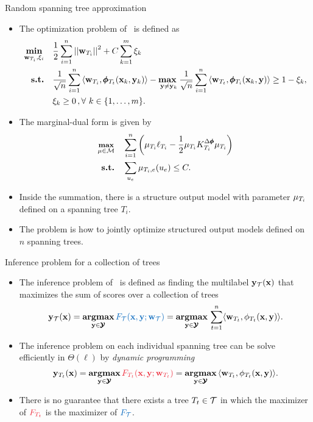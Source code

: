 \documentclass[first=dgreen,second=purple,logo=yellowexc]{aaltoslides}
\begin{document}
%
\begin{frame}{Random spanning tree approximation \rta}
	\begin{itemize}\footnotesize
		\item The optimization problem of \rta\ is defined as \cite{su14multilabelnips}
		\begin{align*}
			\underset{\mathbf {w}_{T_i},\xi_i}{\textbf{min}} & \quad \frac{1}{2}\sum_{i=1}^{n}\left|\left| \mathbf {w}_{T_i} \right|\right|^2 + C\sum_{k=1}^{m}\xi_k\\
			\textbf{s.t.} & \quad \frac{1}{\sqrt{n}}\sum_{i=1}^{n}{ \langle \mathbf {w}_{T_i}, \pmb \phi_{T_t}(\mathbf {x}_k,\mathbf {y}_k) \rangle} - \underset{\mathbf {y} \neq \mathbf {y}_k}{\textbf{max}\ } \frac{1}{\sqrt{n}}\sum_{i=1}^{n}{\langle \mathbf {w}_{T_t}, \pmb \phi_{T_i}(\mathbf {x}_k,\mathbf {y}) \rangle } \geq 1 -  \xi_k, \\
			& \quad \xi_k\ge0\, , \forall\ k \in \{ 1,\dots,m \}.
		\end{align*}
		\item The marginal-dual form is given by
		\begin{align*}\footnotesize
			\underset{\mathbf {\mu}\in\mathcal{M}}{\textbf{max}} & \quad \sum_{i=1}^{n}\left( \mathbf {\mu}_{T_i}\mathbf {\ell}_{T_i} - \frac{1}{2}\mathbf {\mu}_{T_i}K^{\Delta\pmb \phi}_{T_i}\mathbf {\mu}_{T_i}\right)\\
			\textbf{s.t.} & \quad \sum_{u_e}\mathbf {\mu}_{T_i,e}(u_e)\le C.
		\end{align*}
		\item Inside the summation, there is a structure output model with parameter $\mathbf {\mu}_{T_i}$ defined on a spanning tree $T_i$.
		\item The problem is how to jointly optimize structured output models defined on $n$ spanning trees.
	\end{itemize}
\end{frame}

%
\begin{frame}{Inference problem for a collection of trees}
	\begin{itemize}
		\item The inference problem of \rta\ is defined as finding the multilabel $\mathbf {y}_{\mathcal{T}}(\mathbf {x})$ that maximizes the sum of scores over a collection of trees
		\begin{align*}
			\vy_{\Tcal}(\vx) = \underset{\vy\in\vYcal}{\argmax}\,{\color{aaltoblue}F_{\Tcal}(\vx,\vy;\vw_{\Tcal})} = \underset{\vy\in\vYcal}{\argmax}\,\sum_{t=1}^{n}\ip{\vw_{T_t}}{\phi_{T_t}(\vx,\vy)}.
		\end{align*}
		\item The inference problem on each individual spanning tree can be solve efficiently in $\Theta(\ell)$ by \textit{dynamic programming}
		\begin{align*}
			\vy_{T_t}(\vx) = \underset{\vy\in\vYcal}{\argmax}\,{\color{aaltored}F_{T_t}(\vx,\vy;\vw_{T_t})}= \underset{\vy\in\vYcal}{\argmax}\,\ip{\vw_{T_t}}{\phi_{T_t}(\vx,\vy)}.
		\end{align*}
		\item There is no guarantee that there exists a tree $T_t\in\mathcal{T}$ in which the maximizer of ${\color{aaltored}F_{T_t}}$ is the maximizer of ${\color{aaltoblue}F_{\Tcal}}$.
	\end{itemize}
\end{frame}
\end{document}
